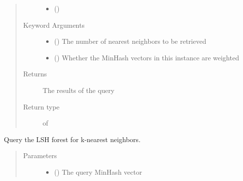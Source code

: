 \documentclass[letterpaper,10pt,english]{sphinxmanual}
\begin{document}
\begin{fulllineitems}
\begin{fulllineitems}
\begin{quote}
\begin{description}
\begin{itemize}
\item {} 
 () \textendash{} 

\end{itemize}

\item[{Keyword Arguments}] \leavevmode\begin{itemize}
\item {} 
 () \textendash{} The number of nearest neighbors to be retrieved

\item {} 
 () \textendash{} Whether the MinHash vectors in this {\hyperref[\detokenize{documentation:tmap.LSHForest}]{}} instance are weighted

\end{itemize}

\item[{Returns}] \leavevmode
The results of the query

\item[{Return type}] \leavevmode
{} of 

\end{description}\end{quote}

\end{fulllineitems}


\begin{fulllineitems}
\label{\detokenize{documentation:tmap.LSHForest.query}}
Query the LSH forest for k-nearest neighbors.
\begin{quote}\begin{description}
\item[{Parameters}] \leavevmode\begin{itemize}
\item {} 
 () \textendash{} The query MinHash vector


\end{itemize}
\end{description}
\end{quote}
\end{fulllineitems}
\end{fulllineitems}
\end{document}
